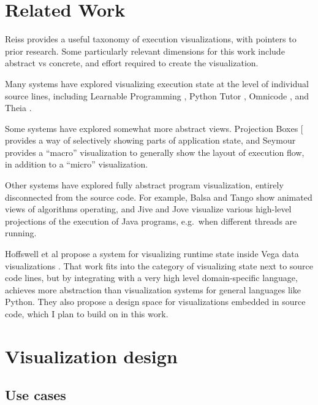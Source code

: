 \documentclass{sigchi}
\begin{document}
\hypertarget{sec:related-work}{%
\section{Related Work}\label{sec:related-work}}

Reiss \autocite{reiss2007} provides a useful taxonomy of execution
visualizations, with pointers to prior research. Some particularly
relevant dimensions for this work include abstract vs concrete, and
effort required to create the visualization.

Many systems have explored visualizing execution state at the level of
individual source lines, including Learnable Programming
\autocite{victora}, Python Tutor \autocite{guo2013}, Omnicode
\autocite{kang2017}, and Theia \autocite{pollock2019}.

Some systems have explored somewhat more abstract views. Projection
Boxes {[}\textcite{lerner2020} provides a way of selectively showing
parts of application state, and Seymour \autocite{kasibatla2018}
provides a ``macro'' visualization to generally show the layout of
execution flow, in addition to a ``micro'' visualization.

Other systems have explored fully abstract program visualization,
entirely disconnected from the source code. For example, Balsa
\autocite{brown1984} and Tango \autocite{stasko1990} show animated views
of algorithms operating, and Jive \autocite{reiss2003} and Jove
\autocite{reiss2005} visualize various high-level projections of the
execution of Java programs, e.g.~when different threads are running.

Hoffswell et al propose a system for visualizing runtime state inside
Vega data visualizations \autocite{hoffswell2018a}. That work fits into
the category of visualizing state next to source code lines, but by
integrating with a very high level domain-specific language, achieves
more abstraction than visualization systems for general languages like
Python. They also propose a design space for visualizations embedded in
source code, which I plan to build on in this work.

\hypertarget{sec:design}{%
\section{Visualization design}\label{sec:design}}

\hypertarget{use-cases}{%
\subsection{Use cases}\label{use-cases}}
\end{document}
